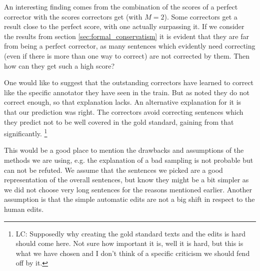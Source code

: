 \documentclass[letter,11pt]{article}
\newcommand{\com}[1]{}
\newcommand{\oa}[1]{\footnote{\color{red}OA: #1}}
\newcommand{\lc}[1]{\footnote{\color{green}LC: #1}}
\begin{document}
		An interesting finding comes from the combination of the scores of a perfect corrector with the scores correctors get (with $M=2$). Some correctors get a result close to the perfect score, with one actually surpassing it. If we consider the results from section \ref{sec:formal_conservatism} it is evident that they are far from being a perfect corrector, as many sentences which evidently need correcting (even if there is more than one way to correct) are not corrected by them. Then how can they get such a high score?
		
		\com{\lc{Is that the right place for this general discussion of when can a system over-correct? Isn't that a prediction that drives us to look at the multi reference? I can't find any other place in which we discuss why over conservatism comes from this problem. could it be? where should this argument come?}
		Consider an all knowing perfect corrector, this corrector takes into account the evaluation coverage and knows the probabilities of corrections to be in the gold standard. Such a corrector will choose the most frequent correction, or no correction at all.  Notably, it will choose not correct when the increase in precision when the correction is in the gold standard contributes in expectation less to the $F$ score than the loss in recall for the times it is not in the gold standard.}
		
		One would like to suggest that the outstanding correctors have learned to correct like the specific annotator they have seen in the train. But as noted they do not correct enough, so that explanation lacks. An alternative explanation for it is that our prediction was right. The correctors avoid correcting sentences which they predict not to be well covered in the gold standard, gaining from that significantly.
		\lc{Supposedly why creating the gold standard texts and the edits is hard should come here. Not sure how important it is, well it is hard, but this is what we have chosen and I don't think of a specific criticism we should fend off by it.}
		
		This would be a good place to mention the drawbacks and assumptions of the methods we are using, e.g. the explanation of a bad sampling is not probable but can not be refuted. We assume that the sentences we picked are a good representation of the overall sentences, but know they might be a bit simpler as we did not choose very long sentences for the reasons mentioned earlier. Another assumption is that the simple automatic edits are not a big shift in respect to the human edits.
		
\end{document}
